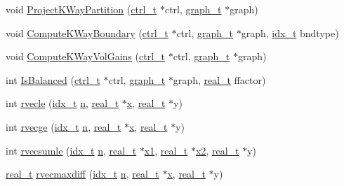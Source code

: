 \begin{DoxyCompactItemize}
\item 
void \hyperlink{a00945_a974cb62c010e195c90f8fb900359957c}{Project\+K\+Way\+Partition} (\hyperlink{a00742}{ctrl\+\_\+t} $\ast$ctrl, \hyperlink{a00734}{graph\+\_\+t} $\ast$graph)
\item 
void \hyperlink{a00945_aa23b4d433fc175282f237653d3edb8a5}{Compute\+K\+Way\+Boundary} (\hyperlink{a00742}{ctrl\+\_\+t} $\ast$ctrl, \hyperlink{a00734}{graph\+\_\+t} $\ast$graph, \hyperlink{a00876_aaa5262be3e700770163401acb0150f52}{idx\+\_\+t} bndtype)
\item 
void \hyperlink{a00945_acd248e19a1ba82c235d52479e231e2f7}{Compute\+K\+Way\+Vol\+Gains} (\hyperlink{a00742}{ctrl\+\_\+t} $\ast$ctrl, \hyperlink{a00734}{graph\+\_\+t} $\ast$graph)
\item 
int \hyperlink{a00945_ae2f5446999d83461cf5763dc4946182a}{Is\+Balanced} (\hyperlink{a00742}{ctrl\+\_\+t} $\ast$ctrl, \hyperlink{a00734}{graph\+\_\+t} $\ast$graph, \hyperlink{a00876_a1924a4f6907cc3833213aba1f07fcbe9}{real\+\_\+t} ffactor)
\item 
int \hyperlink{a00945_afc1c6165b92dba30458b99cecffbd82e}{rvecle} (\hyperlink{a00876_aaa5262be3e700770163401acb0150f52}{idx\+\_\+t} \hyperlink{a00623_a781a04ab095280f838ff3eb0e51312e0}{n}, \hyperlink{a00876_a1924a4f6907cc3833213aba1f07fcbe9}{real\+\_\+t} $\ast$\hyperlink{a00605_ac98c3bb25378222646e977292011625f}{x}, \hyperlink{a00876_a1924a4f6907cc3833213aba1f07fcbe9}{real\+\_\+t} $\ast$y)
\item 
int \hyperlink{a00945_afa3eca456cb1fb976b0a12e8a64476f6}{rvecge} (\hyperlink{a00876_aaa5262be3e700770163401acb0150f52}{idx\+\_\+t} \hyperlink{a00623_a781a04ab095280f838ff3eb0e51312e0}{n}, \hyperlink{a00876_a1924a4f6907cc3833213aba1f07fcbe9}{real\+\_\+t} $\ast$\hyperlink{a00605_ac98c3bb25378222646e977292011625f}{x}, \hyperlink{a00876_a1924a4f6907cc3833213aba1f07fcbe9}{real\+\_\+t} $\ast$y)
\item 
int \hyperlink{a00945_a28bf91b2a028cd146d6961a11252c2b8}{rvecsumle} (\hyperlink{a00876_aaa5262be3e700770163401acb0150f52}{idx\+\_\+t} \hyperlink{a00623_a781a04ab095280f838ff3eb0e51312e0}{n}, \hyperlink{a00876_a1924a4f6907cc3833213aba1f07fcbe9}{real\+\_\+t} $\ast$\hyperlink{a00605_ac39b33361203e68d7820336db48d45e6}{x1}, \hyperlink{a00876_a1924a4f6907cc3833213aba1f07fcbe9}{real\+\_\+t} $\ast$\hyperlink{a00605_aab2463cd078f7c5368f6eb80f5a549b8}{x2}, \hyperlink{a00876_a1924a4f6907cc3833213aba1f07fcbe9}{real\+\_\+t} $\ast$y)
\item 
\hyperlink{a00876_a1924a4f6907cc3833213aba1f07fcbe9}{real\+\_\+t} \hyperlink{a00945_ad9d0577add9657973cd37030daf3eb1e}{rvecmaxdiff} (\hyperlink{a00876_aaa5262be3e700770163401acb0150f52}{idx\+\_\+t} \hyperlink{a00623_a781a04ab095280f838ff3eb0e51312e0}{n}, \hyperlink{a00876_a1924a4f6907cc3833213aba1f07fcbe9}{real\+\_\+t} $\ast$\hyperlink{a00605_ac98c3bb25378222646e977292011625f}{x}, \hyperlink{a00876_a1924a4f6907cc3833213aba1f07fcbe9}{real\+\_\+t} $\ast$y)

\end{DoxyCompactItemize}
